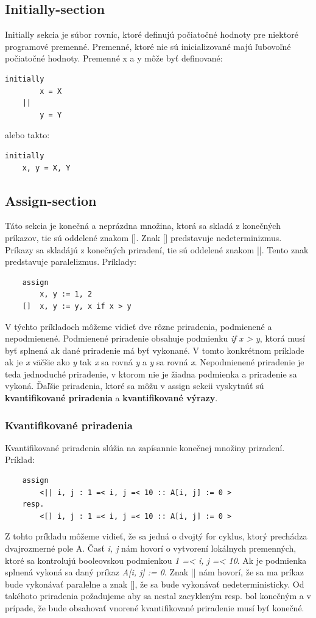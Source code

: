 \subsection{Initially-section}

Initially sekcia je súbor rovníc, ktoré definujú počiatočné hodnoty pre niektoré programové premenné. 
Premenné, ktoré nie sú inicializované majú ľubovoľné počiatočné hodnoty. Premenné x a y môže byť definované:

\begin{lstlisting}
initially
		x = X
	||
		y = Y
\end{lstlisting}

alebo takto:

\begin{lstlisting}
initially
	x, y = X, Y
\end{lstlisting}
\subsection{Assign-section}
Táto sekcia je konečná a neprázdna množina, ktorá sa skladá z konečných príkazov, tie sú oddelené znakom []. 
Znak [] predstavuje nedeterminizmus. Príkazy sa skladájú z konečných priradení, tie sú oddelené znakom ||.
Tento znak predstavuje paralelizmus. Príklady:
\begin{lstlisting}
	assign
		x, y := 1, 2 
	[]	x, y := y, x if x > y	
\end{lstlisting}

V týchto príkladoch môžeme vidieť dve rôzne priradenia, podmienené a nepodmienené. 
Podmienené priradenie obsahuje podmienku \textit{if x > y}, ktorá musí byť splnená ak dané priradenie má byť vykonané.
V tomto konkrétnom príklade ak je \textit{x} väčšie ako \textit{y} tak \textit{x} sa rovná \textit{y} a \textit{y} sa rovná \textit{x}.
Nepodmienené priradenie je teda jednoduché priradenie, v ktorom nie je žiadna podmienka a priradenie sa vykoná.
Ďaľšie priradenia, ktoré sa môžu v assign sekcii vyskytnúť sú \textbf{kvantifikované priradenia} a \textbf{kvantifikované výrazy}.

\subsubsection{Kvantifikované priradenia}

Kvantifikované priradenia slúžia na zapísannie konečnej množiny priradení. Príklad:
\begin{lstlisting}
	assign
		<|| i, j : 1 =< i, j =< 10 :: A[i, j] := 0 >
	resp.
		<[] i, j : 1 =< i, j =< 10 :: A[i, j] := 0 >
\end{lstlisting}
Z tohto príkladu môžeme vidieť, že sa jedná o dvojtý for cyklus, ktorý prechádza dvajrozmerné pole A. 
Časť \textit{i, j} nám hovorí o vytvorení lokálnych premenných, ktoré sa kontrolujú booleovskou podmienkou \textit{1 =< i, j =< 10}.
Ak je podmienka splnená vykoná sa daný príkaz \textit{A[i, j] := 0}. 
Znak || nám hovorí, že sa ma príkaz bude vykonávať paralelne a znak [], že sa bude vykonávať nedeterministicky.
Od takéhoto priradenia požadujeme aby sa nestal zacykleným resp. bol konečným 
a v prípade, že bude obsahovať vnorené kvantifikované priradenie musí byť konečné.

